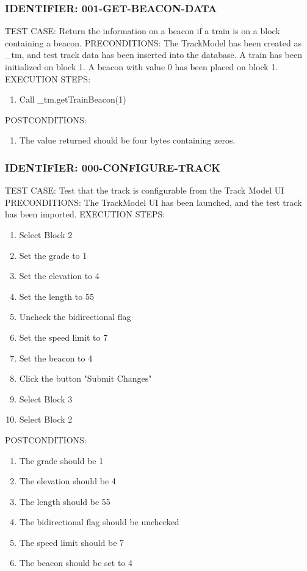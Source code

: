 \documentclass{scrreprt}
\begin{document}
\subsubsection{IDENTIFIER: 001-GET-BEACON-DATA}
TEST CASE: Return the information on a beacon if a train is on a block containing a beacon.
PRECONDITIONS: The TrackModel has been created as _tm, and test track data has been inserted into the database. A train has been initialized on block 1. A beacon with value 0 has been placed on block 1.
EXECUTION STEPS:
\begin{enumerate}
	\item Call _tm.getTrainBeacon(1)
\end{enumerate}
POSTCONDITIONS:
\begin{enumerate}
	\item The value returned should be four bytes containing zeros.
\end{enumerate}

\subsubsection{IDENTIFIER: 000-CONFIGURE-TRACK}
TEST CASE: Test that the track is configurable from the Track Model UI
PRECONDITIONS: The TrackModel UI has been launched, and the test track has been imported.
EXECUTION STEPS:
\begin{enumerate}
	\item Select Block 2
	\item Set the grade to 1
	\item Set the elevation to 4
	\item Set the length to 55
	\item Uncheck the bidirectional flag
	\item Set the speed limit to 7
	\item Set the beacon to 4
	\item Click the button "Submit Changes"
	\item Select Block 3
	\item Select Block 2
\end{enumerate}
POSTCONDITIONS:
\begin{enumerate}
	\item The grade should be 1
	\item The elevation should be 4
	\item The length should be 55
	\item The bidirectional flag should be unchecked
	\item The speed limit should be 7
	\item The beacon should be set to 4
\end{enumerate}
\end{document}

